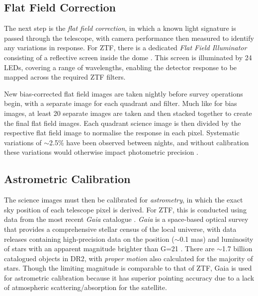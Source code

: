 \subsection*{Flat Field Correction}

The next step is the \emph{flat field correction}, in which a known light signature is passed through the telescope, with camera performance then measured to identify any variations in response. For ZTF, there is a dedicated \emph{Flat Field Illuminator} consisting of a reflective screen inside the dome \cite{ztf_system}. This screen is illuminated by 24 LEDs, covering a range of wavelengths, enabling the detector response to be mapped across the required ZTF filters. 


New bias-corrected flat field images are taken nightly before survey operations begin, with a separate image for each quadrant and filter.  Much like for bias images, at least 20 separate images are taken and then stacked together to create the final flat field images. Each quadrant science image is then divided by the respective flat field image to normalise the response in each pixel. Systematic variations of $\sim$2.5\% have been observed between nights, and without calibration these variations would otherwise impact photometric precision \cite{ztf_data_processing}. 

\subsection*{Astrometric Calibration}

The science images must then be calibrated for \emph{astrometry}, in which the exact sky position of each telescope pixel is derived. For ZTF, this is conducted using data from the most recent \emph{Gaia} catalogue . \emph{Gaia} is a space-based optical survey that provides a comprehensive stellar census of the local universe, with data releases containing high-precision data on the position ($\sim$0.1 mas) and luminosity of stars with an apparent magnitude brighter than G=21 \cite{gaia_dr2}. There are $\sim$1.7 billion catalogued objects in DR2, with \emph{proper motion} also calculated for the majority of stars. Though the limiting magnitude is comparable to that of ZTF, Gaia is used for astrometric calibration because it has superior pointing accuracy due to a lack of atmospheric scattering/absorption for the satellite.

